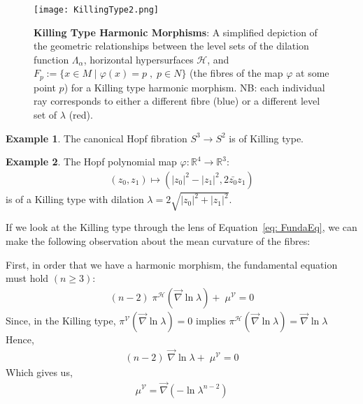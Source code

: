 \documentclass[12pt]{article}
\theoremstyle{definition}
\newtheorem{example}{Example}[subsection]
\numberwithin{equation}{subsection}
\begin{document}
    \begin{figure}[H]
    \centering
    \texttt{[image: KillingType2.png]}
    \caption{\textbf{Killing Type Harmonic Morphisms}: \small A simplified depiction of the geometric relationships between the level sets of the dilation function $\Lambda_\alpha$, horizontal hypersurfaces $\mathcal{H}$, and $F_p := \{ x \in M \mid \varphi(x) = p \;,\; p \in N \}$ (the fibres of the map $\varphi$ at some point $p$)  for a Killing type harmonic morphism. NB: each individual ray corresponds to either a different fibre (blue) or a different level set of $\lambda$ (red). }
    \label{fig:KillingType}
    \end{figure}


\begin{example}
The canonical Hopf fibration $S^3 \rightarrow S^2$ is of Killing type. 
\end{example}
\begin{example}
The Hopf polynomial map $\varphi: \mathbb{R}^4 \rightarrow \mathbb{R}^3$:
\begin{align*}
    (z_0, z_1) \mapsto (|z_0|^2 - |z_1|^2, 2\bar{z_0}z_1)
\end{align*}
is of a Killing type with dilation $\lambda = 2 \sqrt{|z_0|^2 + |z_1|^2}$.
\end{example}


If we look at the Killing type through the lens of Equation~\ref{eq: FundaEq}, we can make the following observation about the mean curvature of the fibres:

First, in order that we have a harmonic morphism, the fundamental equation must hold $(n \geq 3)$:
\begin{align*}
    (n - 2)\; \pi^\mathcal{H} (\vec{\nabla} \ln \lambda ) + \;  \mu^\mathcal{V} = 0
\end{align*}
Since, in the Killing type, $\pi^\mathcal{V}( \vec{\nabla} \ln \lambda) = 0$ implies $\pi^\mathcal{H}( \vec{\nabla} \ln \lambda) =\vec{\nabla} \ln \lambda $
Hence,
\begin{align*}
    (n - 2)\; \vec{\nabla} \ln \lambda  + \;  \mu^\mathcal{V} = 0
\end{align*}
Which gives us,
\begin{align*}
    \mu^\mathcal{V} = \vec{\nabla}(- \ln \lambda^{n-2})
\end{align*}




\end{document}
